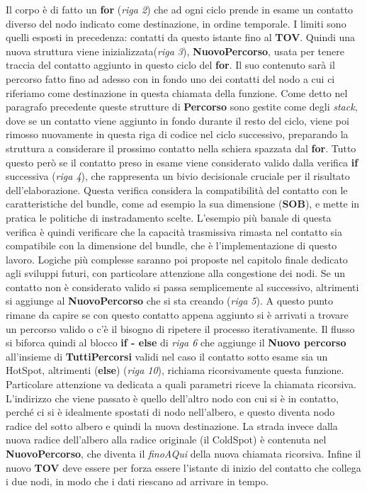 \documentclass[12pt,a4paper,oneside]{book}
\begin{document}
		Il corpo è di fatto un {\bf for} ({\it riga 2}) che ad ogni ciclo prende in esame un contatto diverso del nodo indicato come destinazione, in ordine temporale. I limiti sono quelli esposti in precedenza: contatti da questo istante fino al {\bf TOV}. Quindi una nuova struttura viene inizializzata({\it riga 3}), {\bf NuovoPercorso}, usata per tenere traccia del contatto aggiunto in questo ciclo del {\bf for}. Il suo contenuto sarà il percorso fatto fino ad adesso con in fondo uno dei contatti del nodo a cui ci riferiamo come destinazione in questa chiamata della funzione. Come detto nel paragrafo precedente queste strutture di {\bf Percorso} sono gestite come degli {\it stack}, dove se un contatto viene aggiunto in fondo durante il resto del ciclo, viene poi rimosso nuovamente in questa riga di codice nel ciclo successivo, preparando la struttura a considerare il prossimo contatto nella schiera spazzata dal {\bf for}. Tutto questo però se il contatto preso in esame viene considerato valido dalla verifica {\bf if} successiva ({\it riga 4}), che rappresenta un bivio decisionale cruciale per il risultato dell'elaborazione. Questa verifica considera la compatibilità del contatto con le caratteristiche del bundle, come ad esempio la sua dimensione ({\bf SOB}), e mette in pratica le politiche di instradamento scelte. L'esempio più banale di questa verifica è quindi verificare che la capacità trasmissiva rimasta nel contatto sia compatibile con la dimensione del bundle, che è l'implementazione di questo lavoro. Logiche più complesse saranno poi proposte nel capitolo finale dedicato agli sviluppi futuri, con particolare attenzione alla congestione dei nodi. Se un contatto non è considerato valido si passa semplicemente al successivo, altrimenti si aggiunge al {\bf NuovoPercorso} che si sta creando ({\it riga 5}). A questo punto rimane da capire se con questo contatto appena aggiunto si è arrivati a trovare un percorso valido o c'è il bisogno di ripetere il processo iterativamente. Il flusso si biforca quindi al blocco {\bf if - else} di {\it riga 6} che aggiunge il {\bf Nuovo percorso} all'insieme di {\bf TuttiPercorsi} validi nel caso il contatto sotto esame sia un HotSpot, altrimenti ({\bf else}) ({\it riga 10}), richiama ricorsivamente questa funzione. Particolare attenzione va dedicata a quali parametri riceve la chiamata ricorsiva. L'indirizzo che viene passato è quello dell'altro nodo con cui si è in contatto, perché ci si è idealmente spostati di nodo nell'albero, e questo diventa nodo radice del sotto albero e quindi la nuova destinazione. La strada invece dalla nuova radice dell'albero alla radice originale (il ColdSpot) è contenuta nel {\bf NuovoPercorso}, che diventa il {\it finoAQui} della nuova chiamata ricorsiva. Infine il nuovo {\bf TOV} deve essere per forza essere l'istante di inizio del contatto che collega i due nodi, in modo che i dati riescano ad arrivare in tempo. 
		
\end{document}

